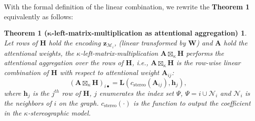 With the formal definition of the linear combination, we rewrite the  \textbf{Theorem 1} equivalently as follows:
\newtheorem*{thm1}{Theorem 1 ($\boldsymbol \kappa$-left-matrix-multiplication as attentional aggregation)}
\begin{thm1}
Let rows of $\mathbf{H}$ hold the encoding $\boldsymbol z_{\mathcal M_i}$, (linear transformed by $\mathbf{W}$)
and $\mathbf{A}$ hold the attentional weights,
the  $\kappa$-left-matrix-multiplication $\mathbf{A} \boxtimes_{\kappa} \mathbf{H}$ performs the attentional aggregation over the rows of $\mathbf{H}$, i.e., 
$\mathbf{A} \boxtimes_{\kappa} \mathbf{H}$ is the row-wise linear combination of  $\mathbf{H}$ with respect to attentional weight $\mathbf{A}_{ij}$: 
\begin{equation}
(\mathbf{A} \boxtimes_{\kappa} \mathbf{H})_{i \bullet}=\boldsymbol L(c_{\text{stereo}}(\mathbf{A}_{ij}), \mathbf{h}_{j}),
\end{equation}
where  $\mathbf{h}_{j}$ is the $j^{th}$ row of $\mathbf H$, $j$ enumerates the index set $\Psi$, $\Psi=i \cup \mathcal N_i$ and $\mathcal N_i$ is the neighbors of $i$ on the graph. $c_{\text{stereo}}(\cdot)$ is the function to output the coefficient in the $\kappa$-stereographic model.
\end{thm1}

